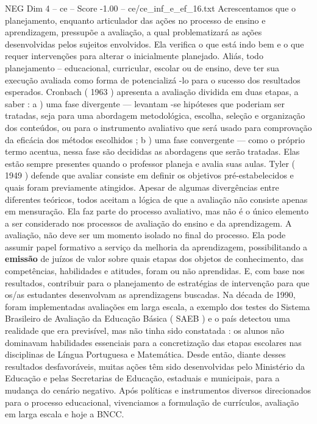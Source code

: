 \begin{textsample}{NEG Dim 4 – ce – Score -1.00 – ce/ce\_inf\_e\_ef\_16.txt}
Acrescentamos que o planejamento, enquanto articulador das ações no processo de ensino e aprendizagem, pressupõe a avaliação, a qual problematizará as ações desenvolvidas pelos sujeitos envolvidos.
Ela verifica o que está indo bem e o que requer intervenções para alterar o inicialmente planejado.
Aliás, todo planejamento – educacional, curricular, escolar ou de ensino, deve ter sua execução avaliada como forma de potencializá -lo para o sucesso dos resultados esperados.
Cronbach ( 1963 ) apresenta a avaliação dividida em duas etapas, a saber : a ) uma fase divergente — levantam -se hipóteses que poderiam ser tratadas, seja para uma abordagem metodológica, escolha, seleção e organização dos conteúdos, ou para o instrumento avaliativo que será usado para comprovação da eficácia dos métodos escolhidos ; b ) uma fase convergente — como o próprio termo acentua, nessa fase são decididas as abordagens que serão tratadas.
Elas estão sempre presentes quando o professor planeja e avalia suas aulas.
Tyler ( 1949 ) defende que avaliar consiste em definir os objetivos pré-estabelecidos e quais foram previamente atingidos.
Apesar de algumas divergências entre diferentes teóricos, todos aceitam a lógica de que a avaliação não consiste apenas em mensuração.
Ela faz parte do processo avaliativo, mas não é o único elemento a ser considerado nos processos de avaliação do ensino e da aprendizagem.
A avaliação, não deve ser um momento isolado no final do processo.
Ela pode assumir papel formativo a serviço da melhoria da aprendizagem, possibilitando a \textbf{emissão} de juízos de valor sobre quais etapas dos objetos de conhecimento, das competências, habilidades e atitudes, foram ou não aprendidas.
E, com base nos resultados, contribuir para o planejamento de estratégias de intervenção para que os/as estudantes desenvolvam as aprendizagens buscadas.
Na década de 1990, foram implementadas avaliações em larga escala, a exemplo dos testes do Sistema Brasileiro de Avaliação da Educação Básica ( SAEB ) e o país detectou uma realidade que era previsível, mas não tinha sido constatada : os alunos não dominavam habilidades essenciais para a concretização das etapas escolares nas disciplinas de Língua Portuguesa e Matemática.
Desde então, diante desses resultados desfavoráveis, muitas ações têm sido desenvolvidas pelo Ministério da Educação e pelas Secretarias de Educação, estaduais e municipais, para a mudança do cenário negativo.
Após políticas e instrumentos diversos direcionados para o processo educacional, vivenciamos a formulação de currículos, avaliação em larga escala e hoje a BNCC.

\end{textsample}
